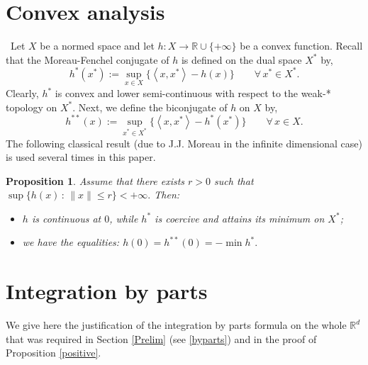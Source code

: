 \documentclass[11pt,letterpaper,reqno]{amsart}
\newtheorem{proposition}[theorem]{Proposition}
\theoremstyle{definition}
\numberwithin{equation}{section}
\newcommand{\R}{\mathbb{R}}
\newcommand{\pairing}[1]{{\left \langle #1 \right \rangle}}
\begin{document}
{\appendix



\section{Convex analysis}\label{app:convex}  \ Let $X$ be a normed space and let $h: X\to \R\cup \{+\infty\}$ be a convex function.
Recall that the Moreau-Fenchel conjugate of $h$ is defined on the dual space $X^*$ by,
$$  h^{*} (x^*)  := \sup_{x\in X}  \big\{ \pairing {x,x^*} - h(x) \big\}\qquad \forall\, x^*\in X^* .$$
Clearly, $h^*$ is convex and lower semi-continuous with respect to the weak-* topology on $X^*$.
Next, we define the biconjugate of $h$ on $X$ by,
$$  h^{**} (x)  :=  \sup_{x^*\in X^*}  \big\{ \pairing {x,x^*} - h^*(x^*) \big\}\qquad \forall \,x\in X .$$
The following classical result (due to J.J.
 Moreau \cite{Moreau1966} in the infinite dimensional case)  is used several times in this paper. 
\begin{proposition}
	\label{duality_classical}
	Assume that there exists $r>0$ such that
	$   \sup \{ h(x) \, :\, \|x\| \le r \} < +\infty .$
	Then:
	\begin{itemize}
\item [(i)]  $h$ is continuous at $0$, while $h^*$ is coercive and attains its minimum on $X^*$;
\item [(ii)]  we have the equalities:  $ h(0) = h^{**}(0) = - \min h^{*}.$
\end{itemize}

	
	
	
\end{proposition}



\section{Integration by parts } 
\label{app:byparts}

We give here the justification of the integration by parts formula on the whole $\R^d$ that was required in Section \ref{Prelim}  (see \eqref{byparts}) and in the proof of Proposition \ref{positive}.

}
\end{document}

